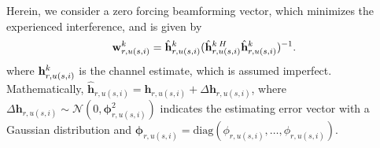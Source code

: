 \documentclass[lettersize,journal]{IEEEtran}
\begin{document}

 Herein, we consider a zero forcing beamforming vector, which minimizes the experienced interference, and is given by \cite{huang2013user}
\begin{equation}
\bold{w}_{r,u(s,i)}^{k} = \hat{\bold{h}}_{r,u(s,i)}^{k}(\hat{\bold{h}}_{r,u(s,i)}^{k \: H} \hat{\bold{h}}_{r,u(s,i)}^{k})^{-1}.
\end{equation}
\noindent where $\bold{h}_{r,u(s,i)}^{k}$ is the channel estimate, which is assumed imperfect. Mathematically,
$\hat{\boldsymbol{h}}_{r,u(s,i)} = \boldsymbol{h}_{r,u(s,i)} + \Delta \boldsymbol{h}_{r,u(s,i)}$, where
$\Delta \boldsymbol{h}_{r,u(s,i)}\sim \mathcal{N}(0,\boldsymbol{\phi}_{r,u(s,i)}^2)$ indicates the estimating error vector with a Gaussian distribution and $\boldsymbol{\phi}_{r,u(s,i)} = \text{diag}(\phi_{r,u(s,i)},\ldots,\phi_{r,u(s,i)}).$
\vspace*{-.8em}
\end{document}

